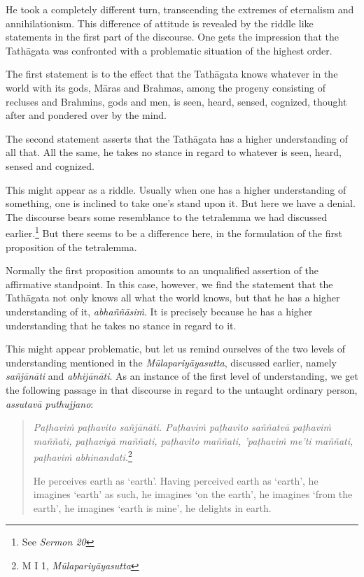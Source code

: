 He took a completely different turn, transcending the extremes of eternalism and annihilationism. This difference of attitude is revealed by the riddle like statements in the first part of the discourse. One gets the impression that the Tathāgata was confronted with a problematic situation of the highest order.

The first statement is to the effect that the Tathāgata knows whatever in the world with its gods, Māras and Brahmas, among the progeny consisting of recluses and Brahmins, gods and men, is seen, heard, sensed, cognized, thought after and pondered over by the mind.

The second statement asserts that the Tathāgata has a higher understanding of all that. All the same, he takes no stance in regard to whatever is seen, heard, sensed and cognized.

This might appear as a riddle. Usually when one has a higher understanding of something, one is inclined to take one's stand upon it. But here we have a denial. The discourse bears some resemblance to the tetralemma we had discussed earlier.\footnote{See \emph{Sermon 20}} But there seems to be a difference here, in the formulation of the first proposition of the tetralemma.

Normally the first proposition amounts to an unqualified assertion of the affirmative standpoint. In this case, however, we find the statement that the Tathāgata not only knows all what the world knows, but that he has a higher understanding of it, \emph{abhaññāsiṁ}. It is precisely because he has a higher understanding that he takes no stance in regard to it.

This might appear problematic, but let us remind ourselves of the two levels of understanding mentioned in the \emph{Mūlapariyāyasutta}, discussed earlier, namely \emph{sañjānāti} and \emph{abhijānāti}. As an instance of the first level of understanding, we get the following passage in that discourse in regard to the untaught ordinary person, \emph{assutavā puthujjano}:

\begin{quote}
\emph{Paṭhaviṁ paṭhavito sañjānāti. Paṭhaviṁ paṭhavito saññatvā paṭhaviṁ maññati, paṭhaviyā maññati, paṭhavito maññati, 'paṭhaviṁ me'ti maññati, paṭhaviṁ abhinandati.}\footnote{M I 1, \emph{Mūlapariyāyasutta}}

He perceives earth as `earth'. Having perceived earth as `earth', he imagines `earth' as such, he imagines `on the earth', he imagines `from the earth', he imagines `earth is mine', he delights in earth.
\end{quote}


